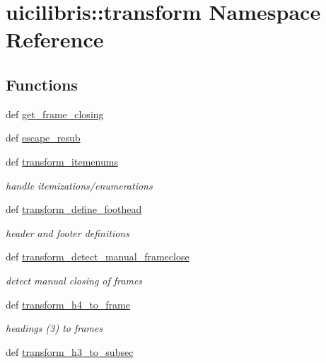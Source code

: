 \hypertarget{namespaceuicilibris_1_1transform}{\section{uicilibris\-:\-:transform \-Namespace \-Reference}
\label{namespaceuicilibris_1_1transform}
}
\subsection*{\-Functions}
\begin{DoxyCompactItemize}
\item 
def \hyperlink{namespaceuicilibris_1_1transform_a5fd016b32b6c371cfc6a64805c869bf2}{get\-\_\-frame\-\_\-closing}
\item 
def \hyperlink{namespaceuicilibris_1_1transform_aa64a6c96679a86a7476091e3800eeb1d}{escape\-\_\-resub}
\item 
def \hyperlink{namespaceuicilibris_1_1transform_a5e4e43440e494b5328b11bbd2e0ae90e}{transform\-\_\-itemenums}
\begin{DoxyCompactList}\small\item\em handle itemizations/enumerations \end{DoxyCompactList}\item 
def \hyperlink{namespaceuicilibris_1_1transform_aa8b7f3f1ff9b3d23518c343b99a77b64}{transform\-\_\-define\-\_\-foothead}
\begin{DoxyCompactList}\small\item\em header and footer definitions \end{DoxyCompactList}\item 
def \hyperlink{namespaceuicilibris_1_1transform_ae7114bbf6b1f5fe97b0d4e6b8037fd83}{transform\-\_\-detect\-\_\-manual\-\_\-frameclose}
\begin{DoxyCompactList}\small\item\em detect manual closing of frames \end{DoxyCompactList}\item 
def \hyperlink{namespaceuicilibris_1_1transform_af3b3a54f8bb65069951c6b693f107ffe}{transform\-\_\-h4\-\_\-to\-\_\-frame}
\begin{DoxyCompactList}\small\item\em headings (3) to frames \end{DoxyCompactList}\item 
def \hyperlink{namespaceuicilibris_1_1transform_af5f99adea6602bc8a737693e9bbb42db}{transform\-\_\-h3\-\_\-to\-\_\-subsec}

\end{DoxyCompactItemize}
